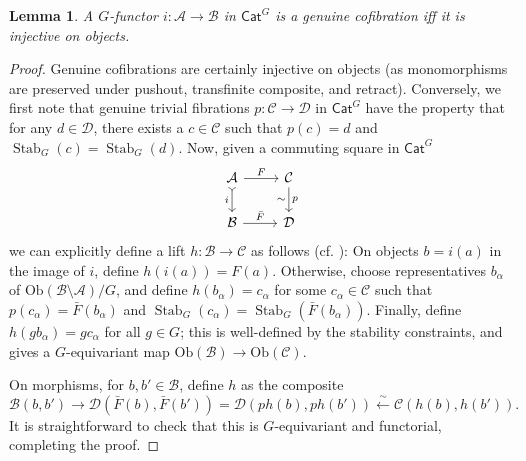 \documentclass[a4paper,10pt
,draft
]{article}%
\numberwithin{equation}{section}
\numberwithin{figure}{section}
\newtheorem{lemma}[equation]{Lemma}%
\theoremstyle{definition} %
\newcommand{\longto}{\longrightarrow}%
\newcommand{\Cat}{\mathsf{Cat}}
\DeclareMathOperator{\Stab}{Stab}
\newcommand{\1}{\ensuremath{\mathbbm 1}}%
\begin{document}
\begin{lemma}
      \label{CATCOF_LEM}
      A $G$-functor $i \colon \mathcal A \to \mathcal B$ in $\Cat^G$
      is a genuine cofibration
      iff
      it is injective on objects.
\end{lemma}
\begin{proof}
      Genuine cofibrations are certainly injective on objects (as monomorphisms are preserved under pushout, transfinite composite, and retract).
      Conversely, we first note that genuine trivial fibrations $p \colon \mathcal C \to \mathcal D$ in $\Cat^G$ have the property that
      for any $d \in \mathcal D$, there exists a $c \in \mathcal C$ such that $p(c) = d$ and $\Stab_G(c) = \Stab_G(d)$.
      Now, given a commuting square in $\Cat^G$
      \[
            \begin{tikzcd}
                  \mathcal A \arrow[d, "i"', rightarrowtail] \arrow[r, "F"]
                  &
                  \mathcal C \arrow[d, "p", "\sim"']
                  \\
                  \mathcal B \arrow[r, "\bar F"]
                  &
                  \mathcal D
            \end{tikzcd}
      \]
      we can explicitly define a lift $h \colon \mathcal B \to \mathcal C$ as follows (cf. \cite[proof of Thm. 6.7]{Str00}):
      On objects $b = i(a)$ in the image of $i$, define $h(i(a)) = F(a)$.
      Otherwise, choose representatives $b_\alpha$ of $\mathrm{Ob}(\mathcal B \setminus \mathcal A)/G$,
      and define $h(b_\alpha) = c_\alpha$ for some $c_\alpha \in \mathcal C$ such that
      $p(c_\alpha) = \bar F(b_\alpha)$ and $\Stab_G(c_\alpha) = \Stab_G(\bar F(b_\alpha))$.
      Finally, define $h(g b_\alpha) = g c_\alpha$ for all $g \in G$; this is well-defined by the stability constraints,
      and gives a $G$-equivariant map $\mathrm{Ob}(\mathcal B) \to \mathrm{Ob}(\mathcal C)$.

      On morphisms, for $b,b' \in \mathcal B$, define $h$ as the composite
      \[
            \mathcal B(b,b') \longto
            \mathcal D(\bar F(b), \bar F(b')) = \mathcal D(ph(b),ph(b')) \xleftarrow{\sim}
            \mathcal C(h(b), h(b')).
      \]
      It is straightforward to check that this is $G$-equivariant and functorial,
      completing the proof.
\end{proof}
\end{document}
